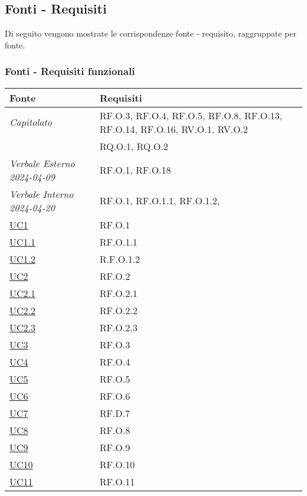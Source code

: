 \subsection{Fonti - Requisiti}
Di seguito vengono mostrate le corrispondenze fonte - requisito, raggruppate per fonte.

\subsubsection{Fonti - Requisiti funzionali}

\begin{longtable}{|P{4,5cm}|>{\arraybackslash}P{9cm}|}
  \hline
  \textbf{Fonte} & \textbf{Requisiti} \\
  \hline
  \emph{Capitolato} & RF.O.3, RF.O.4, RF.O.5, RF.O.8, RF.O.13, RF.O.14, RF.O.16, RV.O.1, RV.O.2 \\
  \hline
  \NdP{} & RQ.O.1, RQ.O.2 \\
  \hline
  \emph{Verbale Esterno 2024-04-09} & RF.O.1, RF.O.18 \\
  \hline
  \emph{Verbale Interno 2024-04-20} & RF.O.1, RF.O.1.1, RF.O.1.2,  \\
  \hline
  \hyperref[UC1]{UC1} & RF.O.1 \\
  \hline
  \hyperref[UC1point1]{UC1.1} & RF.O.1.1 \\
  \hline
  \hyperref[UC1]{UC1.2} & R.F.O.1.2 \\
  \hline
  \hyperref[UC2]{UC2} & RF.O.2 \\
  \hline
  \hyperref[UC2point1]{UC2.1} & RF.O.2.1 \\
  \hline
  \hyperref[UC2point2]{UC2.2} & RF.O.2.2 \\
  \hline
  \hyperref[UC2point3]{UC2.3} & RF.O.2.3 \\
  \hline
  \hyperref[UC3]{UC3} & RF.O.3 \\
  \hline
  \hyperref[UC4]{UC4} & RF.O.4 \\
  \hline
  \hyperref[UC5]{UC5} & RF.O.5 \\
  \hline
  \hyperref[UC6]{UC6} & RF.O.6 \\
  \hline
  \hyperref[UC7]{UC7} & RF.D.7 \\
  \hline
  \hyperref[UC8]{UC8} & RF.O.8 \\
  \hline
  \hyperref[UC9]{UC9} & RF.O.9 \\
  \hline
  \hyperref[UC10]{UC10} & RF.O.10 \\
  \hline
  \hyperref[UC11]{UC11} & RF.O.11 \\

\end{longtable}
